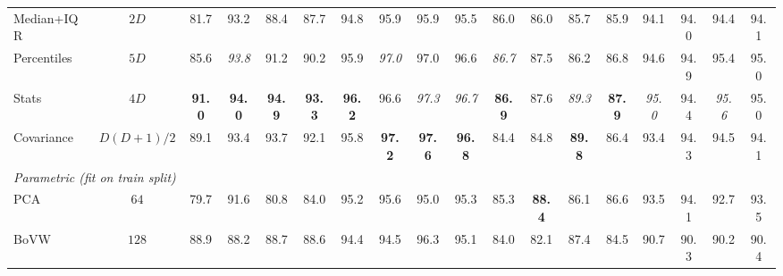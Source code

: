 \begin{table}[!tb]
\begin{tabular}{lc|cccc|cccc|cccc|cccc}
    Median+IQR      & $2D$             & 81.7 & 93.2 & 88.4 & 87.7 & 94.8 & 95.9 & 95.9 & 95.5 & 86.0 & 86.0 & 85.7 & 85.9 & 94.1 & 94.0 & 94.4 & 94.1 \\
    Percentiles     & $5D$             & 85.6 & \textit{93.8} & 91.2 & 90.2 & 95.9 & \textit{97.0} & 97.0 & 96.6 & \textit{86.7} & 87.5 & 86.2 & 86.8 & 94.6 & 94.9 & 95.4 & 95.0 \\
    \rowcolor{green!10}
    Stats           & $4D$             & \textbf{91.0} & \textbf{94.0} & \textbf{94.9} & \textbf{93.3} & \textbf{96.2} & 96.6 & \textit{97.3} & \textit{96.7} & \textbf{86.9} & 87.6 & \textit{89.3} & \textbf{87.9} & \textit{95.0} & 94.4 & \textit{95.6} & 95.0 \\
    Covariance      & $D(D{+}1)/2$     & 89.1 & 93.4 & 93.7 & 92.1 & 95.8 & \textbf{97.2} & \textbf{97.6} & \textbf{96.8} & 84.4 & 84.8 & \textbf{89.8} & 86.4 & 93.4 & 94.3 & 94.5 & 94.1 \\
    \midrule
    \multicolumn{18}{l}{\textit{Parametric (fit on train split)}} \\[2pt]
    PCA             & $64$             & 79.7 & 91.6 & 80.8 & 84.0 & 95.2 & 95.6 & 95.0 & 95.3 & 85.3 & \textbf{88.4} & 86.1 & 86.6 & 93.5 & 94.1 & 92.7 & 93.5 \\
    BoVW            & $128$            & 88.9 & 88.2 & 88.7 & 88.6 & 94.4 & 94.5 & 96.3 & 95.1 & 84.0 & 82.1 & 87.4 & 84.5 & 90.7 & 90.3 & 90.2 & 90.4 \\
    \bottomrule
  \end{tabular}
\end{table}
